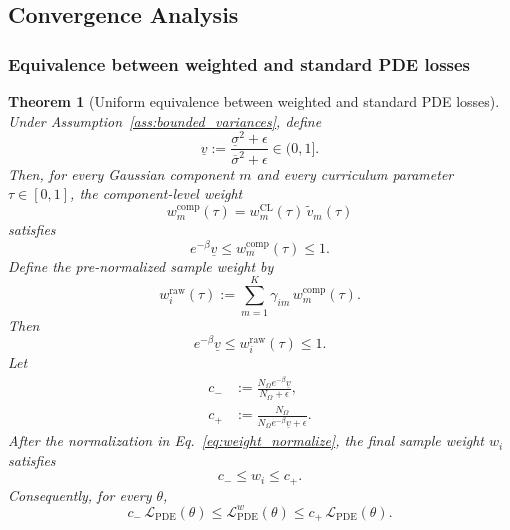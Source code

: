 \documentclass{article}
\theoremstyle{plain}
\newtheorem{theorem}{Theorem}[section]
\theoremstyle{definition}
\theoremstyle{remark}
\begin{document}
\subsection{Convergence Analysis}
\label{app:convergence}

\subsubsection{Equivalence between weighted and standard PDE losses}

\begin{theorem}[Uniform equivalence between weighted and standard PDE losses]
	\label{thm:weight_equiv}
	Under Assumption~\ref{ass:bounded_variances}, define
	\begin{equation}
		\underline{v}
		:=
		\frac{\underline{\sigma}^{2}+\epsilon}
		{\overline{\sigma}^{2}+\epsilon}
		\in(0,1].
		\label{eq:app_v_under}
	\end{equation}
	Then, for every Gaussian component $m$ and every curriculum parameter
	$\tau\in[0,1]$, the component-level weight
	\begin{equation}
		w_m^{\mathrm{comp}}(\tau)
		=
		w_m^{\mathrm{CL}}(\tau)\,\tilde v_m(\tau)
		\label{eq:app_component_weight}
	\end{equation}
	satisfies
	\begin{equation}
		e^{-\beta}\underline{v}
		\leqslant
		w_m^{\mathrm{comp}}(\tau)
		\leqslant
		1.
		\label{eq:app_component_weight_bound}
	\end{equation}
	Define the pre-normalized sample weight by
	\begin{equation}
		w_i^{\mathrm{raw}}(\tau)
		:=
		\sum_{m=1}^{K}\gamma_{im}\,w_m^{\mathrm{comp}}(\tau).
		\label{eq:app_raw_weight}
	\end{equation}
	Then
	\begin{equation}
		e^{-\beta}\underline{v}
		\leqslant
		w_i^{\mathrm{raw}}(\tau)
		\leqslant
		1.
		\label{eq:app_raw_weight_bound}
	\end{equation}
	Let
	\begin{equation}
		\begin{aligned}
			c_- &:= \frac{N_{\Omega}e^{-\beta}\underline{v}}{N_{\Omega}+\epsilon},\\
			c_+ &:= \frac{N_{\Omega}}{N_{\Omega}e^{-\beta}\underline{v}+\epsilon}.
		\end{aligned}
		\label{eq:app_weight_constants}
	\end{equation}
	After the normalization in Eq.~\eqref{eq:weight_normalize}, the final
	sample weight $w_i$ satisfies
	\begin{equation}
		c_- \leqslant w_i \leqslant c_+.
		\label{eq:app_final_weight_bound}
	\end{equation}
	Consequently, for every $\theta$,
	\begin{equation}
		c_-\,
		\mathcal{L}_{\mathrm{PDE}}(\theta)
		\leqslant
		\mathcal{L}_{\mathrm{PDE}}^{w}(\theta)
		\leqslant
		c_+\,
		\mathcal{L}_{\mathrm{PDE}}(\theta).
		\label{eq:app_loss_equivalence}
	\end{equation}
\end{theorem}
\end{document}
